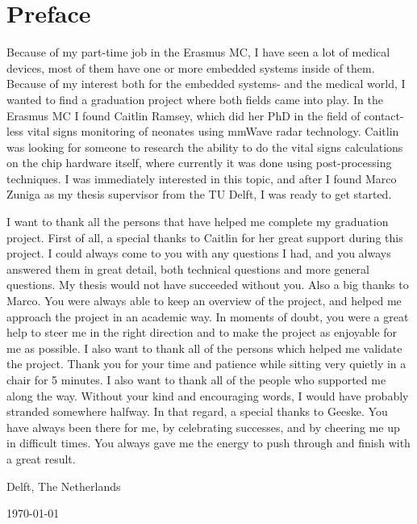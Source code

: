 \chapter*{Preface}

Because of my part-time job in the Erasmus MC, I have seen a lot of medical devices, most of them have one or more embedded systems inside of them. Because of my interest both for the embedded systems- and the medical world, I wanted to find a graduation project where both fields came into play. In the Erasmus MC I found Caitlin Ramsey, which did her PhD in the field of contact-less vital signs monitoring of neonates using mmWave radar technology. Caitlin was looking for someone to research the ability to do the vital signs calculations on the chip hardware itself, where currently it was done using post-processing techniques. I was immediately interested in this topic, and after I found Marco Zuniga as my thesis supervisor from the TU Delft, I was ready to get started.

\vspace{1\baselineskip}

I want to thank all the persons that have helped me complete my graduation project. First of all, a special thanks to Caitlin for her great support during this project. I could always come to you with any questions I had, and you always answered them in great detail, both technical questions and more general questions. My thesis would not have succeeded without you. Also a big thanks to Marco. You were always able to keep an overview of the project, and helped me approach the project in an academic way. In moments of doubt, you were a great help to steer me in the right direction and to make the project as enjoyable for me as possible. I also want to thank all of the persons which helped me validate the project. Thank you for your time and patience while sitting very quietly in a chair for 5 minutes. I also want to thank all of the people who supported me along the way. Without your kind and encouraging words, I would have probably stranded somewhere halfway. In that regard, a special thanks to Geeske. You have always been there for me, by celebrating successes, and by cheering me up in difficult times. You always gave me the energy to push through and finish with a great result. 

\vspace{1\baselineskip}

\reportAuthor

\vspace{1\baselineskip}

\noindent
Delft, The Netherlands

\noindent
\today